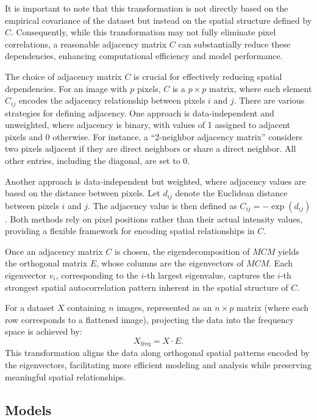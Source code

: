 \documentclass[12pt]{article}
\begin{document}
It is important to note that this transformation is not directly based on the empirical covariance of the dataset but instead on the spatial structure defined by \( C \). Consequently, while this transformation may not fully eliminate pixel correlations, a reasonable adjacency matrix \( C \) can substantially reduce these dependencies, enhancing computational efficiency and model performance.

The choice of adjacency matrix \( C \) is crucial for effectively reducing spatial dependencies. For an image with \( p \) pixels, \( C \) is a \( p \times p \) matrix, where each element \( C_{ij} \) encodes the adjacency relationship between pixels \( i \) and \( j \). There are various strategies for defining adjacency. One approach is data-independent and unweighted, where adjacency is binary, with values of 1 assigned to adjacent pixels and 0 otherwise. For instance, a ``2-neighbor adjacency matrix'' considers two pixels adjacent if they are direct neighbors or share a direct neighbor. All other entries, including the diagonal, are set to 0.

Another approach is data-independent but weighted, where adjacency values are based on the distance between pixels. Let \( d_{ij} \) denote the Euclidean distance between pixels \( i \) and \( j \). The adjacency value is then defined as \( C_{ij} = -\exp(d_{ij}) \). Both methods rely on pixel positions rather than their actual intensity values, providing a flexible framework for encoding spatial relationships in \( C \).

Once an adjacency matrix \( C \) is chosen, the eigendecomposition of \( MCM \) yields the orthogonal matrix \( E \), whose columns are the eigenvectors of \( MCM \). Each eigenvector \( v_i \), corresponding to the \( i \)-th largest eigenvalue, captures the \( i \)-th strongest spatial autocorrelation pattern inherent in the spatial structure of \( C \).

For a dataset \( X \) containing \( n \) images, represented as an \( n \times p \) matrix (where each row corresponds to a flattened image), projecting the data into the frequency space is achieved by:
\[
	X_{\text{freq}} = X \cdot E.
\]
This transformation aligns the data along orthogonal spatial patterns encoded by the eigenvectors, facilitating more efficient modeling and analysis while preserving meaningful spatial relationships.



\subsection{Models}
\end{document}
